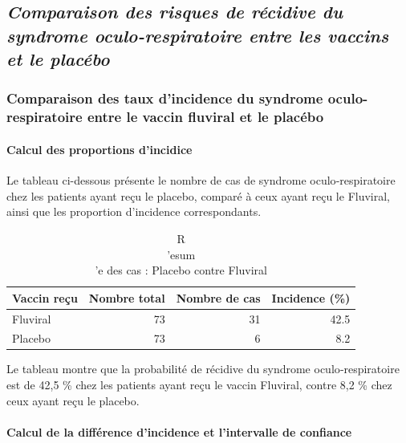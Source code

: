 \documentclass[
]{article}
\begin{document}
\subsection{\texorpdfstring{\emph{Comparaison des risques de récidive du
syndrome oculo-respiratoire entre les vaccins et le
placébo}}{Comparaison des risques de récidive du syndrome oculo-respiratoire entre les vaccins et le placébo}}\label{comparaison-des-risques-de-ruxe9cidive-du-syndrome-oculo-respiratoire-entre-les-vaccins-et-le-placuxe9bo}

\subsubsection{Comparaison des taux d'incidence du syndrome
oculo-respiratoire entre le vaccin fluviral et le
placébo}\label{comparaison-des-taux-dincidence-du-syndrome-oculo-respiratoire-entre-le-vaccin-fluviral-et-le-placuxe9bo}

\paragraph{Calcul des proportions
d'incidice}\label{calcul-des-proportions-dincidice}

Le tableau ci-dessous présente le nombre de cas de syndrome
oculo‑respiratoire chez les patients ayant reçu le placebo, comparé à
ceux ayant reçu le Fluviral, ainsi que les proportion d'incidence
correspondants.

\begin{table}[t]
\caption*{
{\fontsize{20}{25}\selectfont  R\\'esum\\'e des cas : Placebo contre Fluviral\fontsize{12}{15}\selectfont }
} 
\fontsize{12.0pt}{14.0pt}\selectfont
\begin{tabular*}{\linewidth}{@{\extracolsep{\fill}}lrrr}
\toprule
Vaccin re\c{c}u & Nombre total & Nombre de cas & Incidence (\%) \\ 
\midrule\addlinespace[2.5pt]
Fluviral & 73 & 31 & 42.5 \\ 
Placebo & 73 & 6 & 8.2 \\ 
\bottomrule
\end{tabular*}
\end{table}

Le tableau montre que la probabilité de récidive du syndrome
oculo‑respiratoire est de 42,5 \% chez les patients ayant reçu le vaccin
Fluviral, contre 8,2 \% chez ceux ayant reçu le placebo.

\paragraph{Calcul de la différence d'incidence et l'intervalle de
confiance}\label{calcul-de-la-diffuxe9rence-dincidence-et-lintervalle-de-confiance}
\end{document}
